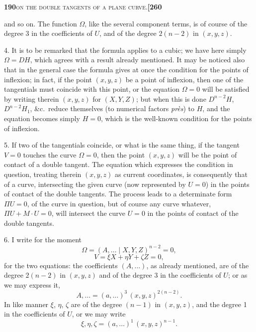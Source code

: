 \documentclass[11pt]{article}
\newcommand{\Cdel}{\mid}
\begin{document}
\newpage

\noindent\textbf{190}\hfill\textsc{on the double tangents of a plane curve.}\hfill\textbf{[260}

\medskip

\noindent and so on. The function $\Omega$, like the several component terms, is of course of the degree 3 in the coefficients of $U$, and of the degree $2(n-2)$ in $(x, y, z)$.

\medskip

4. It is to be remarked that the formula applies to a cubic; we have here simply $\Omega = DH$, which agrees with a result already mentioned. It may be noticed also that in the general case the formula gives at once the condition for the points of inflexion; in fact, if the point $(x, y, z)$ be a point of inflexion, then one of the tangentials must coincide with this point, or the equation $\Omega = 0$ will be satisfied by writing therein $(x, y, z)$ for $(X, Y, Z)$; but when this is done $D^{n-2}H$, $D^{n-2}H_1$, \&c.\ reduce themselves (to numerical factors \textit{pr\`es}) to $H$, and the equation becomes simply $H = 0$, which is the well-known condition for the points of inflexion.

\medskip

5. If two of the tangentials coincide, or what is the same thing, if the tangent $V = 0$ touches the curve $\Omega = 0$, then the point $(x, y, z)$ will be the point of contact of a double tangent. The equation which expresses the condition in question, treating therein $(x, y, z)$ as current coordinates, is consequently that of a curve, intersecting the given curve (now represented by $U = 0$) in the points of contact of the double tangents. The process leads to a determinate form $\Pi U = 0$, of the curve in question, but of course any curve whatever, $\Pi U + M \cdot U = 0$, will intersect the curve $U = 0$ in the points of contact of the double tangents.

\medskip

6. I write for the moment
\[
\Omega = (A, \ldots\Cdel X, Y, Z)^{n-2} = 0,
\]
\[
V = \xi X + \eta Y + \zeta Z = 0,
\]
for the two equations: the coefficients $(A, \ldots)$, as already mentioned, are of the degree $2(n-2)$ in $(x, y, z)$ and of the degree 3 in the coefficients of $U$; or as we may express it,
\[
A, \ldots = (a, \ldots)^3\,(x, y, z)^{2(n-2)}.
\]
In like manner $\xi$, $\eta$, $\zeta$ are of the degree $(n-1)$ in $(x, y, z)$, and the degree 1 in the coefficients of $U$, or we may write
\[
\xi, \eta, \zeta = (a, \ldots)^1\,(x, y, z)^{n-1}.
\]
\end{document}
